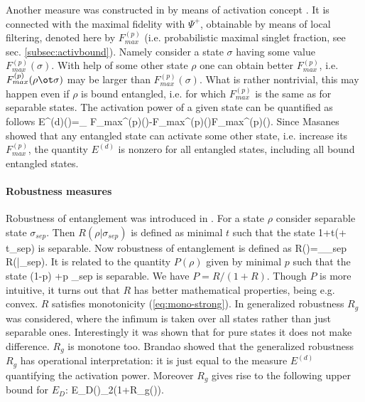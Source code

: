 \documentclass[rmp,12pt,preprint]{revtex4-2}
\begin{document}
Another measure was constructed in \cite{Brandao2005-witent} by means
of activation concept \cite{activation}. It is connected with the maximal
fidelity with $\Psi^+$, obtainable by means of local filtering, denoted here by $F_{max}^{(p)}$ (i.e. probabilistic maximal singlet fraction, see sec.
\ref{subsec:activbound}). Namely consider a state
$\sigma$ having some value $F_{max}^{(p)}(\sigma)$. With help of some other
state $\rho$ one can obtain better $F_{max}^{(p)}$, i.e. $F_{max}^{(p)}(\rho\ot \sigma)$ may be larger than $F_{max}^{(p)}(\sigma)$. What is rather nontrivial, this
may happen even if $\rho$ is bound entangled, i.e. for which $F_{max}^{(p)}$
is the same as for separable states. The activation power of a given
state can be quantified as follows \be E^{(d)}(\rho)=\sup_\sigma
{F_{max}^{(p)}(\rho\ot \sigma)-F_{max}^{(p)}(\sigma)\over F_{max}^{(p)}(\sigma)}. \ee Since Masanes \cite{Masanes1_activation} showed that any entangled state can activate
some other state, i.e. increase its $F_{max}^{(p)}$, the quantity $E^{(d)}$ is
nonzero for all entangled states,  including all bound entangled
states.



\paragraph{Robustness measures}


Robustness of entanglement was introduced in
\cite{VidalT1998-robustness}. For a state $\rho$
consider separable state $\sigma_{sep}$. Then $R(\rho|\sigma_{sep})$
is defined as minimal $t$ such that  the state
\be
{1+t}(\rho + t\sigma_{sep})
\ee
is separable. Now robustness of entanglement is defined
as
\be
R(\rho)=\inf_{\sigma_{sep}} R(\rho|\sigma_{sep}).
\ee
It is related to the quantity
$P(\rho)$ given by minimal $p$ such that the state
\be
(1-p) \rho  +p \sigma_{sep}
\ee
is separable. We have $P=R/(1+R)$. Though $P$ is more intuitive, it turns out
that $R$ has better mathematical properties, being e.g. convex. $R$ satisfies
monotonicity (\ref{eq:mono-strong}). In \cite{Steiner2003-robust-gen,HarrowN2003-robust}
generalized robustness $R_g$ was considered, where the infimum is taken
over all states rather than just separable ones. Interestingly it was shown that for
pure states it does not make difference. $R_g$ is monotone too.
Brandao \cite{Brandao2005-witent} showed that  the generalized
robustness $R_g$ has operational interpretation: it is
just equal to the measure $E^{(d)}$ quantifying the activation power.
Moreover  \cite{Brandao2005-witent} $R_g$ gives rise to the following upper bound for $E_D$:
\be
E_D(\rho)\leq \log_2(1+R_g(\rho)).
\ee
\end{document}
